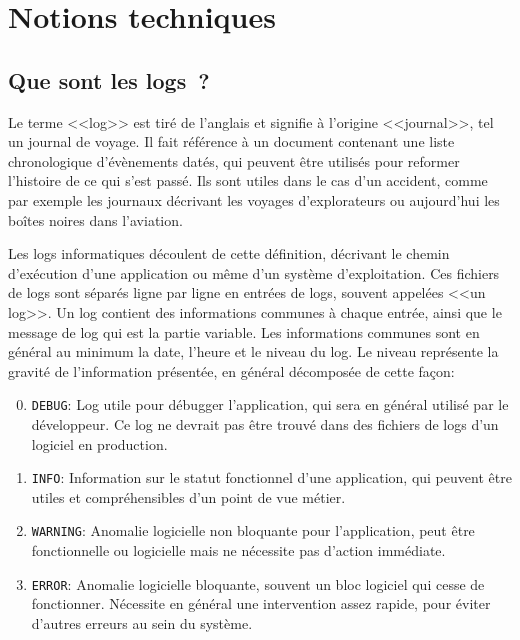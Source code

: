 \documentclass[openany, 11pt]{memoir}
\begin{document}
\newpage
\chapter{Notions techniques}


\section{Que sont les logs~?}
\label{logs}

Le terme <<log>> est tiré de l'anglais et signifie à l'origine <<journal>>, tel un journal de voyage. Il fait référence à un document contenant une liste chronologique d'évènements datés, qui peuvent être utilisés pour reformer l'histoire de ce qui s'est passé. Ils sont utiles dans le cas d'un accident, comme par exemple les journaux décrivant les voyages d'explorateurs ou aujourd'hui les boîtes noires dans l'aviation.

Les logs informatiques découlent de cette définition, décrivant le chemin d'exécution d'une application ou même d'un système d'exploitation. Ces fichiers de logs sont séparés ligne par ligne en entrées de logs, souvent appelées <<un log>>. Un log contient des informations communes à chaque entrée, ainsi que le message de log qui est la partie variable. Les informations communes sont en général au minimum la date, l'heure et le niveau du log. Le niveau représente la gravité de l'information présentée, en général décomposée de cette façon:

\begin{enumerate}
	\setcounter{enumi}{-1}
	\item \texttt{DEBUG}: Log utile pour débugger l'application, qui sera en général utilisé par le développeur. Ce log ne devrait pas être trouvé dans des fichiers de logs d'un logiciel en production.
	\item \texttt{INFO}: Information sur le statut fonctionnel d'une application, qui peuvent être utiles et compréhensibles d'un point de vue métier.
	\item \texttt{WARNING}: Anomalie logicielle non bloquante pour l'application, peut être fonctionnelle ou logicielle mais ne nécessite pas d'action immédiate.
	\item \texttt{ERROR}: Anomalie logicielle bloquante, souvent un bloc logiciel qui cesse de fonctionner. Nécessite en général une intervention assez rapide, pour éviter d'autres erreurs au sein du système.
\end{enumerate}
\end{document}
